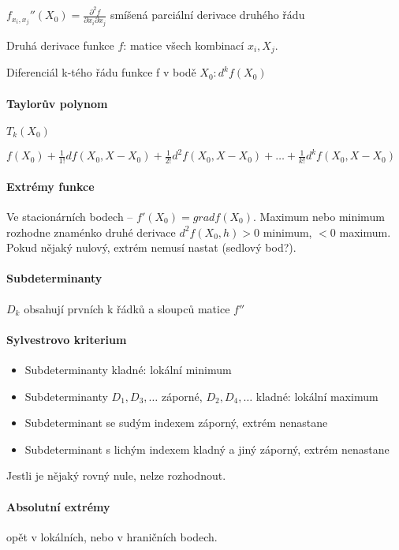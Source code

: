 \documentclass[a4paper, 11pt]{report}
\begin{document}
$f_{x_i, x_j}''(X_0) = \frac{\partial^2f}{\partial x_i \partial x_j}$ smíšená parciální derivace druhého řádu

Druhá derivace funkce $f$: matice všech kombinací $x_i, X_j$.

Diferenciál k-tého řádu funkce f v bodě $X_0: d^k f(X_0)$

\paragraph{Taylorův polynom} $T_k(X_0)$

$f(X_0) + \frac{1}{1!}df(X_0, X - X_0) + \frac{1}{2!}d^2f(X_0, X - X_0) + \dots + \frac{1}{k!}d^kf(X_0, X - X_0)$

\paragraph{Extrémy funkce} Ve stacionárních bodech -- $f'(X_0) = grad  f(X_0)$. Maximum nebo minimum rozhodne znaménko druhé derivace $d^2f(X_0,h) > 0$ minimum, $< 0$ maximum. Pokud nějaký nulový, extrém nemusí nastat (sedlový bod?).

\paragraph{Subdeterminanty} $D_k$ obsahují prvních k řádků a sloupců matice $f''$

\paragraph{Sylvestrovo kriterium}
\begin{itemize}
	\item Subdeterminanty kladné: lokální minimum
	\item Subdeterminanty $D_1, D_3, \dots $ záporné, $D_2, D_4, \dots $ kladné: lokální maximum
	\item Subdeterminant se sudým indexem záporný, extrém nenastane
	\item Subdeterminant s lichým indexem kladný a jiný záporný, extrém nenastane
\end{itemize}

Jestli je nějaký rovný nule, nelze rozhodnout.

\paragraph{Absolutní extrémy} opět v lokálních, nebo v hraničních bodech.
\end{document}
